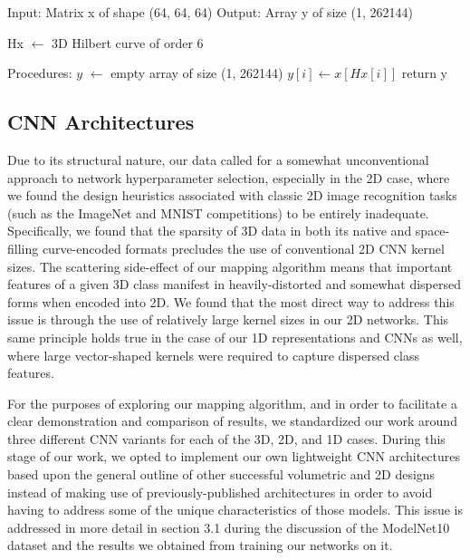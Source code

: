\documentclass{article}
\begin{document}
\begin{algorithm}[h!]
  \caption{3D to 1D Hilbert Curve Mapping}
  \begin{algorithmic}
    \STATE Input: Matrix x of shape (64, 64, 64)
    \STATE Output: Array y of size (1, 262144)

    \STATE Hx $\gets$ 3D Hilbert curve of order 6

    \STATE Procedures:
    \STATE $y$ $\gets$ empty array of size (1, 262144)
        \STATE $y[ i ] \gets x[Hx[ i ]]$
      \ENDFOR
    \STATE return y  
  \end{algorithmic}
\end{algorithm}

\subsection{CNN Architectures}
Due to its structural nature, our data called for a somewhat unconventional approach to network hyperparameter selection, especially in the 2D case, where we found the design heuristics associated with classic 2D image recognition tasks (such as the ImageNet and MNIST competitions) to be entirely inadequate. Specifically, we found that the sparsity of 3D data in both its native and space-filling curve-encoded formats precludes the use of conventional 2D CNN kernel sizes. The scattering side-effect of our mapping algorithm means that important features of a given 3D class manifest in heavily-distorted and somewhat dispersed forms when encoded into 2D. We found that the most direct way to address this issue is through the use of relatively large kernel sizes in our 2D networks. This same principle holds true in the case of our 1D representations and CNNs as well, where large vector-shaped kernels were required to capture dispersed class features. 

For the purposes of exploring our mapping algorithm, and in order to facilitate a clear demonstration and comparison of results, we standardized our work around three different CNN variants for each of the 3D, 2D, and 1D cases. During this stage of our work, we opted to implement our own lightweight CNN architectures based upon the general outline of other successful volumetric and 2D designs instead of making use of previously-published architectures in order to avoid having to address some of the unique characteristics of those models. This issue is addressed in more detail in section 3.1 during the discussion of the ModelNet10 dataset and the results we obtained from training our networks on it. 
\end{document}
